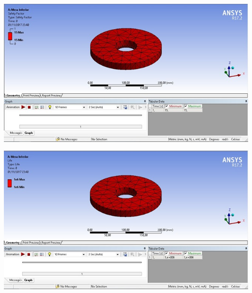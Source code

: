     \begin{center}
    	\includegraphics[scale=0.7]{figuras/fator_seguranca_2}
        \label{fator_seguranca_2}
    \end{center}
    
    \begin{center}
    	\includegraphics[scale=0.7]{figuras/vida_util_2}
        \label{vida_util_2}
    \end{center}

